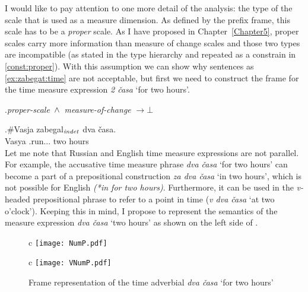 I would like to pay attention to one more detail of the analysis: the type of the scale that is used as a measure dimension. As defined by the prefix frame, this scale has to be a \textit{proper} scale. As I have proposed in Chapter~\ref{Chapter5}, proper scales carry more information than measure of change scales and those two types are incompatible (as stated in the type hierarchy and repeated as a constrain in \ref{const:proper}). With this assumption we can show why sentences as \ref{ex:zabegat:time} are not acceptable, but first we need to construct the frame for the time measure expression \textit{2 \v{c}asa} `for two hours'. 

\ex.\label{const:proper}\textit{proper-scale} $\,\wedge\,$ \textit{measure-of-change} $\rightarrow \bot$

\exg.\label{ex:zabegat:time}\#Vasja zabegal$_{\mathit{indet}}$ dva \v{c}asa.\\
Vasya .run... two hours\\

Let me note that Russian and English time measure expressions are not parallel. For example, the accusative time measure phrase \textit{dva \v{c}asa} `for two hours' can become a part of a prepositional construction \textit{za dva \v{c}asa} `in two hours', which is not possible for English \textit{(*in for two hours)}. Furthermore, it can be used in the \textit{v-}headed prepositional phrase to refer to a point in time (\textit{v dva \v{c}asa} `at two o'clock'). Keeping this in mind, I propose to represent the semantics of the measure expression \textit{dva \v{c}asa} `two hours' as shown on the left side of . 

\begin{figure}
\begin{tabular}[t]{c}
\texttt{[image: NumP.pdf]}\\
\end{tabular}
\hfill
\begin{tabular}[t]{c}
\texttt{[image: VNumP.pdf]}\\
\end{tabular}
\caption{Frame representation of the time adverbial \textit{dva \v{c}asa} `for two hours' \label{frame:2hours}}
\end{figure}


